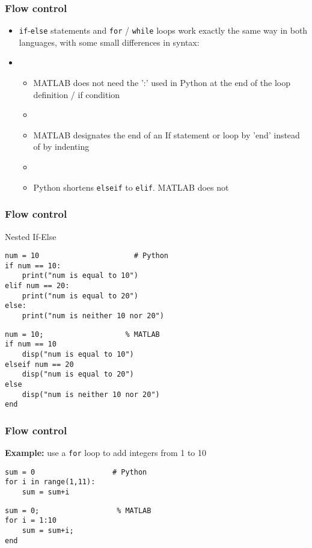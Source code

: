 \documentclass[english,14pt]{beamer}
\begin{document}

\begin{frame}[fragile]

\frametitle{Flow control}

\begin{itemize}
	\item \texttt{if}-\texttt{else} statements and \texttt{for} / \texttt{while} loops work exactly the same way in both languages, with some small differences in syntax:
	\item[]
	\begin{itemize}
		\item MATLAB does not need the ':' used in Python at the end of the loop definition / if condition
		\item[]
		\item MATLAB designates the end of an If statement or loop by 'end' instead of by indenting
		\item[]
		\item Python shortens \texttt{elseif} to \texttt{elif}. MATLAB does not
	\end{itemize}
\end{itemize}
\end{frame}


\begin{frame}[fragile]

\frametitle{Flow control}

Nested If-Else

\begin{lstlisting}[style=CStyle]
num = 10                      # Python
if num == 10:
    print("num is equal to 10")
elif num == 20:
    print("num is equal to 20")
else:
    print("num is neither 10 nor 20")
\end{lstlisting}   

\begin{lstlisting}[style=MStyle]
num = 10;                   % MATLAB
if num == 10
    disp("num is equal to 10")
elseif num == 20
    disp("num is equal to 20")
else
    disp("num is neither 10 nor 20")
end
\end{lstlisting}

\end{frame}


\begin{frame}[fragile]

\frametitle{Flow control}

\textbf{Example:} use a \texttt{for} loop to add integers from 1 to 10

\begin{lstlisting}[style=CStyle]
sum = 0                  # Python
for i in range(1,11):
    sum = sum+i
\end{lstlisting}
\begin{lstlisting}[style=MStyle]
sum = 0;                  % MATLAB
for i = 1:10
    sum = sum+i;
end
\end{lstlisting} 
\end{frame}
\end{document}

